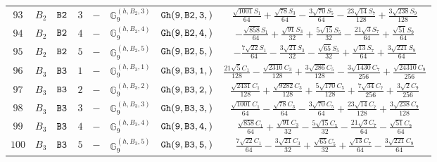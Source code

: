 \documentclass[fleqn,8pt]{jsarticle}
\begin{document}
\begin{table}[ht!]
\begin{center}
\begin{tabular}{cccccccc}
$ 93 $ & $ B_{2} $ & $ {\tt B2} $ & $ 3 $ & $ - $ & $ \mathbb{G}_{9}^{(h,B_{2},3)} $ & $ {\tt Gh(9,B2,3,)} $ & $ \frac{\sqrt{1001} S_{1}}{64} + \frac{\sqrt{78} S_{3}}{64} - \frac{3 \sqrt{70} S_{5}}{64} - \frac{23 \sqrt{14} S_{7}}{128} + \frac{3 \sqrt{238} S_{9}}{128} $ \\
$ 94 $ & $ B_{2} $ & $ {\tt B2} $ & $ 4 $ & $ - $ & $ \mathbb{G}_{9}^{(h,B_{2},4)} $ & $ {\tt Gh(9,B2,4,)} $ & $ - \frac{\sqrt{858} S_{1}}{64} + \frac{\sqrt{91} S_{3}}{32} + \frac{5 \sqrt{15} S_{5}}{32} - \frac{21 \sqrt{3} S_{7}}{64} + \frac{\sqrt{51} S_{9}}{64} $ \\
$ 95 $ & $ B_{2} $ & $ {\tt B2} $ & $ 5 $ & $ - $ & $ \mathbb{G}_{9}^{(h,B_{2},5)} $ & $ {\tt Gh(9,B2,5,)} $ & $ - \frac{7 \sqrt{22} S_{1}}{64} - \frac{3 \sqrt{21} S_{3}}{32} - \frac{\sqrt{65} S_{5}}{32} + \frac{\sqrt{13} S_{7}}{64} + \frac{3 \sqrt{221} S_{9}}{64} $ \\
$ 96 $ & $ B_{3} $ & $ {\tt B3} $ & $ 1 $ & $ - $ & $ \mathbb{G}_{9}^{(h,B_{3},1)} $ & $ {\tt Gh(9,B3,1,)} $ & $ \frac{21 \sqrt{5} C_{1}}{128} - \frac{\sqrt{2310} C_{3}}{128} + \frac{3 \sqrt{286} C_{5}}{128} - \frac{3 \sqrt{1430} C_{7}}{256} + \frac{\sqrt{24310} C_{9}}{256} $ \\
$ 97 $ & $ B_{3} $ & $ {\tt B3} $ & $ 2 $ & $ - $ & $ \mathbb{G}_{9}^{(h,B_{3},2)} $ & $ {\tt Gh(9,B3,2,)} $ & $ \frac{\sqrt{2431} C_{1}}{128} + \frac{\sqrt{9282} C_{3}}{128} + \frac{5 \sqrt{170} C_{5}}{128} + \frac{7 \sqrt{34} C_{7}}{256} + \frac{3 \sqrt{2} C_{9}}{256} $ \\
$ 98 $ & $ B_{3} $ & $ {\tt B3} $ & $ 3 $ & $ - $ & $ \mathbb{G}_{9}^{(h,B_{3},3)} $ & $ {\tt Gh(9,B3,3,)} $ & $ \frac{\sqrt{1001} C_{1}}{64} - \frac{\sqrt{78} C_{3}}{64} - \frac{3 \sqrt{70} C_{5}}{64} + \frac{23 \sqrt{14} C_{7}}{128} + \frac{3 \sqrt{238} C_{9}}{128} $ \\
$ 99 $ & $ B_{3} $ & $ {\tt B3} $ & $ 4 $ & $ - $ & $ \mathbb{G}_{9}^{(h,B_{3},4)} $ & $ {\tt Gh(9,B3,4,)} $ & $ \frac{\sqrt{858} C_{1}}{64} + \frac{\sqrt{91} C_{3}}{32} - \frac{5 \sqrt{15} C_{5}}{32} - \frac{21 \sqrt{3} C_{7}}{64} - \frac{\sqrt{51} C_{9}}{64} $ \\
$ 100 $ & $ B_{3} $ & $ {\tt B3} $ & $ 5 $ & $ - $ & $ \mathbb{G}_{9}^{(h,B_{3},5)} $ & $ {\tt Gh(9,B3,5,)} $ & $ \frac{7 \sqrt{22} C_{1}}{64} - \frac{3 \sqrt{21} C_{3}}{32} + \frac{\sqrt{65} C_{5}}{32} + \frac{\sqrt{13} C_{7}}{64} - \frac{3 \sqrt{221} C_{9}}{64} $ \\
 \hline \hline
\end{tabular}
\end{center}
\end{table}
\end{document}
